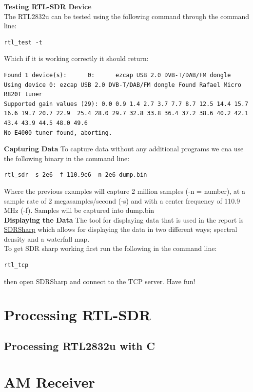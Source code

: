 \documentclass[12pt]{article}
\begin{document}
\textbf{Testing RTL-SDR Device}\\
The RTL2832u can be tested using the following command through the command line:
\lstset{escapechar=@,style=bash}
\begin{lstlisting}
rtl_test -t
\end{lstlisting}
Which if it is working correctly it should return:\\[10cm]
\begin{lstlisting}
Found 1 device(s):		0:		ezcap USB 2.0 DVB-T/DAB/FM dongle
Using device 0: ezcap USB 2.0 DVB-T/DAB/FM dongle Found Rafael Micro R820T tuner
Supported gain values (29): 0.0 0.9 1.4 2.7 3.7 7.7 8.7 12.5 14.4 15.7 16.6 19.7 20.7 22.9  25.4 28.0 29.7 32.8 33.8 36.4 37.2 38.6 40.2 42.1 43.4 43.9 44.5 48.0 49.6
No E4000 tuner found, aborting.
\end{lstlisting}
\textbf{Capturing Data}
To capture data without any additional programs we cna use the following binary in the command line:
\begin{lstlisting}
rtl_sdr -s 2e6 -f 110.9e6 -n 2e6 dump.bin
\end{lstlisting}
Where the previous examples will capture 2 million samples (-n = number), at a sample rate of 2 megasamples/second (-s) and with a center frequency of 110.9 MHz (-f). Samples will be captured into dump.bin\\[3mm]
\textbf{Displaying the Data}
The tool for displaying data that is used in the report is \href{http://airspy.com/download/}{SDRSharp} which allows for displaying the data in two different ways; spectral density and a waterfall map.\\
To get SDR sharp working first run the following in the command line:
\begin{lstlisting}
rtl_tcp
\end{lstlisting}
then open SDRSharp and connect to the TCP server. Have fun!



\newpage
\section{Processing RTL-SDR}
\subsection{Processing RTL2832u with C}


\newpage
\section{AM Receiver}
\end{document}
